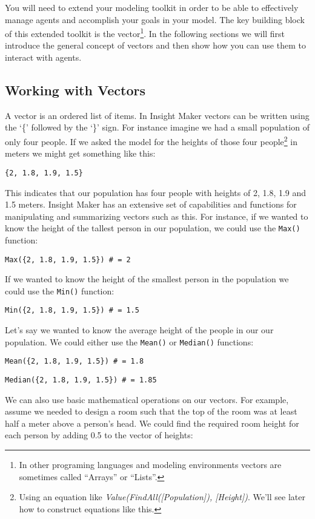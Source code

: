 \documentclass[]{memoir}
\begin{document}
You will need to extend your modeling toolkit in order to be able to
effectively manage agents and accomplish your goals in your model. The
key building block of this extended toolkit is the vector\footnote{In
  other programing languages and modeling environments vectors are
  sometimes called ``Arrays'' or ``Lists''.}. In the following sections
we will first introduce the general concept of vectors and then show how
you can use them to interact with agents.

\subsection{Working with Vectors}

A vector is an ordered list of items. In Insight Maker vectors can be
written using the `\{' followed by the `\}' sign. For instance imagine
we had a small population of only four people. If we asked the model for
the heights of those four people\footnote{Using an equation like
  \emph{Value(FindAll({[}Population{]}), {[}Height{]})}. We'll see later
  how to construct equations like this.} in meters we might get
something like this:

\lstinline!{2, 1.8, 1.9, 1.5}!

This indicates that our population has four people with heights of 2,
1.8, 1.9 and 1.5 meters. Insight Maker has an extensive set of
capabilities and functions for manipulating and summarizing vectors such
as this. For instance, if we wanted to know the height of the tallest
person in our population, we could use the \lstinline!Max()! function:

\lstinline!Max({2, 1.8, 1.9, 1.5}) # = 2!

If we wanted to know the height of the smallest person in the population
we could use the \lstinline!Min()! function:

\lstinline!Min({2, 1.8, 1.9, 1.5}) # = 1.5!

Let's say we wanted to know the average height of the people in our our
population. We could either use the \lstinline!Mean()! or
\lstinline!Median()! functions:

\lstinline!Mean({2, 1.8, 1.9, 1.5}) # = 1.8!

\lstinline!Median({2, 1.8, 1.9, 1.5}) # = 1.85!

We can also use basic mathematical operations on our vectors. For
example, assume we needed to design a room such that the top of the room
was at least half a meter above a person's head. We could find the
required room height for each person by adding 0.5 to the vector of
heights:
\end{document}
